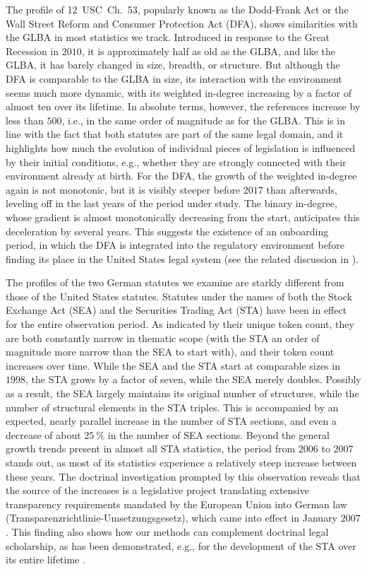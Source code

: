 \documentclass[utf8,sort&compress,table,hidelinks]{frontiersFPHY} %
\begin{document}
The profile of 12~USC~Ch.~53, popularly known as the Dodd-Frank Act or the Wall Street Reform and Consumer Protection Act (DFA), shows similarities with the GLBA in most statistics we track.
Introduced in response to the Great Recession in $2010$, 
it is approximately half as old as the GLBA, 
and like the GLBA, it has barely changed in size, breadth, or structure.
But although the DFA is comparable to the GLBA in size, 
its interaction with the environment seems much more dynamic, 
with its weighted in-degree increasing by a factor of almost ten over its lifetime.
In absolute terms, however, the references increase by less than $500$, i.e., in the same order of magnitude as for the GLBA.
This is in line with the fact that both statutes are part of the same legal domain, and it highlights how much the evolution of individual pieces of legislation is influenced by their initial conditions, e.g., whether they are strongly connected with their environment already at birth.
For the DFA, the growth of the weighted in-degree again is not monotonic, 
but it is visibly steeper before $2017$ than afterwards, leveling off in the last years of the period under study.
The binary in-degree, whose gradient is almost monotonically decreasing from the start, anticipates this deceleration by several years.
This suggests the existence of an onboarding period, in which the DFA is integrated into the regulatory environment before finding its place in the United States legal system (see the related discussion in \cite{mclaughlin2021}).

The profiles of the two German statutes we examine are starkly different from those of the United States statutes.
Statutes under the names of both the Stock Exchange Act (SEA) and the Securities Trading Act (STA) have been in effect for the entire observation period.
As indicated by their unique token count, they are both constantly narrow in thematic scope (with the STA an order of magnitude more narrow than the SEA to start with), 
and their token count increases over time.
While the SEA and the STA start at comparable sizes in $1998$, the STA grows by a factor of seven, while the SEA merely doubles.
Possibly as a result, the SEA largely maintains its original number of structures,
while the number of structural elements in the STA triples.
This is accompanied by an expected, nearly parallel increase in the number of STA sections, 
and even a decrease of about $25~\%$ in the number of SEA sections.
Beyond the general growth trends present in almost all STA statistics,
the period from $2006$ to $2007$ stands out, as most of its statistics experience a relatively steep increase between these years.
The doctrinal investigation prompted by this observation reveals that the source of the increases is a legislative project translating extensive transparency requirements mandated by the European Union into German law (Transparenzrichtlinie-Umsetzungsgesetz), which came into effect in January $2007$.
This finding also shows how our methods can complement doctrinal legal scholarship, as has been demonstrated, e.g., for the development of the STA over its entire lifetime \cite{coupette2019a}.
\end{document}
